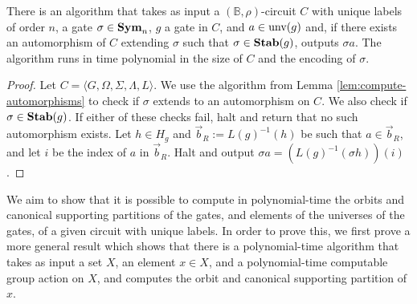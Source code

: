 \documentclass[../paper.tex]{subfiles}
\begin{document}
\begin{lem}
  There is an algorithm that takes as input a $(\mathbb{B}, \rho)$-circuit $C$
  with unique labels of order $n$, a gate $\sigma \in \text{\textbf{Sym}}_n$, $g$ a gate in
  $C$, and $a \in \text{unv}(g)$ and, if there exists an automorphism of $C$
  extending $\sigma$ such that $\sigma \in \text{\textbf{Stab}}(g)$, outputs $\sigma a$. The
  algorithm runs in time polynomial in the size of $C$ and the encoding of
  $\sigma$.
  \label{lem:compute-automorphisms-labels}
\end{lem}
\begin{proof}
  Let $C = \langle G, \Omega, \Sigma, \Lambda, L \rangle$. We use the algorithm
  from Lemma \ref{lem:compute-automorphisms} to check if $\sigma$ extends to an
  automorphism on $C$. We also check if $\sigma \in \text{\textbf{Stab}}(g)$. If either of
  these checks fail, halt and return that no such automorphism exists. Let $h
  \in H_g$ and $\vec{b}_R := L(g)^{-1}(h)$ be such that $a \in \vec{b}_R$, and
  let $i$ be the index of $a$ in $\vec{b}_R$. Halt and output $\sigma a =
  (L(g)^{-1}(\sigma h))(i)$.
\end{proof}

We aim to show that it is possible to compute in polynomial-time the orbits and
canonical supporting partitions of the gates, and elements of the universes of
the gates, of a given circuit with unique labels. In order to prove this, we
first prove a more general result which shows that there is a polynomial-time
algorithm that takes as input a set $X$, an element $x \in X$, and a
polynomial-time computable group action on $X$, and computes the orbit and
canonical supporting partition of $x$.
\end{document}
